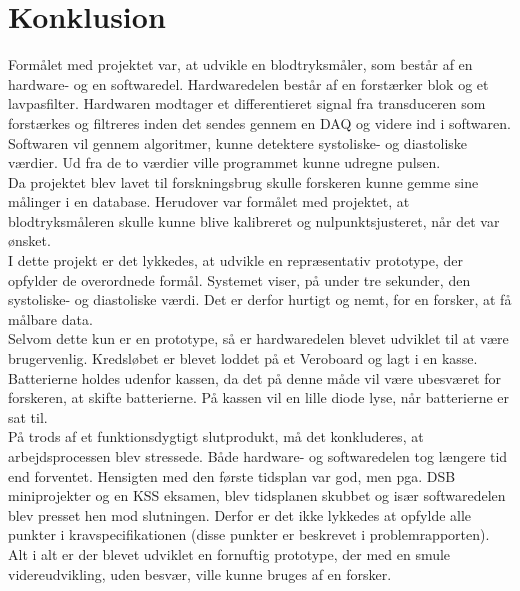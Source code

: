 \chapter{Konklusion}
Formålet med projektet var, at udvikle en blodtryksmåler, som består af en hardware- og en softwaredel. Hardwaredelen består af en forstærker blok og et lavpasfilter. Hardwaren modtager et differentieret signal fra transduceren som forstærkes og filtreres inden det sendes gennem en DAQ og videre ind i softwaren. Softwaren vil gennem algoritmer, kunne detektere systoliske- og diastoliske værdier. Ud fra de to værdier ville programmet kunne udregne pulsen. \\
Da projektet blev lavet til forskningsbrug skulle forskeren kunne gemme sine målinger i en database. Herudover var formålet med projektet, at blodtryksmåleren skulle kunne blive kalibreret og nulpunktsjusteret, når det var ønsket. \\
I dette projekt er det lykkedes, at udvikle en repræsentativ prototype, der opfylder de overordnede formål. Systemet viser, på under tre sekunder, den systoliske- og diastoliske værdi. Det er derfor hurtigt og nemt, for en forsker, at få målbare data.\\
Selvom dette kun er en prototype, så er hardwaredelen blevet udviklet til at være brugervenlig. Kredsløbet er blevet loddet på et Veroboard og lagt i en kasse. Batterierne holdes udenfor kassen, da det på denne måde vil være ubesværet for forskeren, at skifte batterierne. På kassen vil en lille diode lyse, når batterierne er sat til. \\
På trods af et funktionsdygtigt slutprodukt, må det konkluderes, at arbejdsprocessen blev stressede. Både hardware- og softwaredelen tog længere tid end forventet. Hensigten med den første tidsplan var god, men pga. DSB miniprojekter og en KSS eksamen, blev tidsplanen skubbet og især softwaredelen blev presset hen mod slutningen. Derfor er det ikke lykkedes at opfylde alle punkter i kravspecifikationen (disse punkter er beskrevet i problemrapporten). \\
Alt i alt er der blevet udviklet en fornuftig prototype, der med en smule videreudvikling, uden besvær, ville kunne bruges af en forsker. \\

